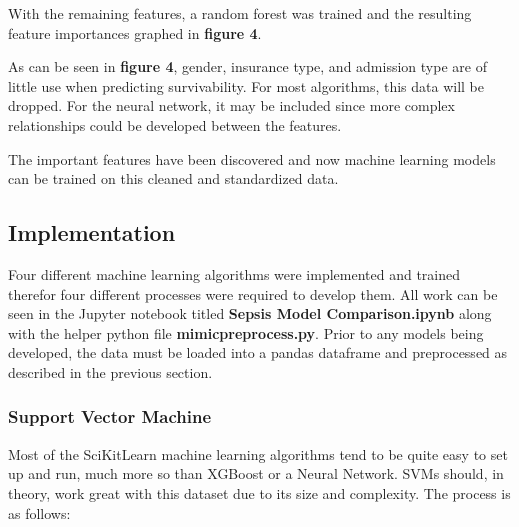 \documentclass[11pt]{article}
\begin{document}
		With the remaining features, a random forest was trained and the resulting feature importances graphed in \textbf{figure 4}.
		
	
		As can be seen in \textbf{figure 4}, gender, insurance type, and admission type are of little use when predicting survivability. For most algorithms, this data will be dropped. For the neural network, it may be included since more complex relationships could be developed between the features.
	
		The important features have been discovered and now machine learning models can be trained on this cleaned and standardized data.
	
	\subsection{Implementation}
	Four different machine learning algorithms were implemented and trained therefor four different processes were required to develop them. All work can be seen in the Jupyter notebook titled \textbf{Sepsis Model Comparison.ipynb} along with the helper python file \textbf{mimicpreprocess.py}. Prior to any models being developed, the data must be loaded into a pandas dataframe and preprocessed as described in the previous section.
	
	\subsubsection{Support Vector Machine}
		Most of the SciKitLearn machine learning algorithms tend to be quite easy to set up and run, much more so than XGBoost or a Neural Network. SVMs should, in theory, work great with this dataset due to its size and complexity. The process is as follows:
		
\end{document}
